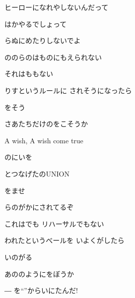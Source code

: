 \documentclass[14pt]{ltjsarticle}
\begin{document}
{\item
  ヒーローになれやしないんだって
  \jisho{}

  はかやるでしょって
  \jisho{}

  らぬにめたりしないでよ
  \jisho{}

\item
  ののらのはものにもえられない
  \jisho{}

  それはももない
  \jisho{}

  りすというルールに されそうになったら
  \jisho{}

  をそう
  \jisho{}

  さあたちだけのをこそうか
  \jisho{}

\item
  A wish, A wish come true
  \jisho{}

  のにいを
  \jisho{}

  とつなげたのUNION
  \jisho{}

\item
  をませ
  \jisho{}

  らのがかにされてるぞ
  \jisho{}

  これはでも リハーサルでもない
  \jisho{}

  われたというべールを いよくがしたら
  \jisho{}

  いのがる
  \jisho{}

  あののようにをぼうか
  \jisho{}

\item
  ― を``''からいにたんだ!
  \jisho{}

  
}
\end{document}

